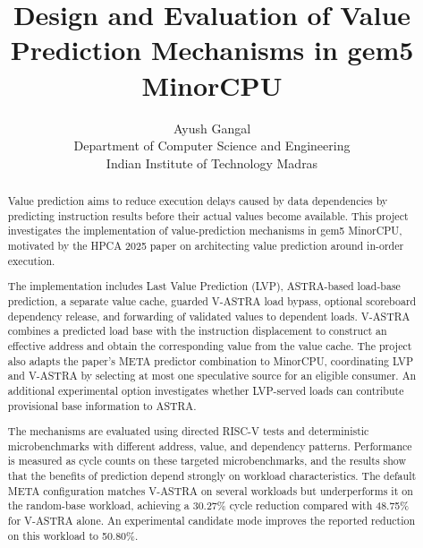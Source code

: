 \documentclass[11pt,a4paper]{article}
\title{
    \textbf{Design and Evaluation of Value Prediction
    Mechanisms in gem5 MinorCPU}
}
\author{
    Ayush Gangal\\
    Department of Computer Science and Engineering\\
    Indian Institute of Technology Madras
}
\date{}
\begin{document}
\maketitle

\begin{abstract}
Value prediction aims to reduce execution delays caused by data
dependencies by predicting instruction results before their actual
values become available. This project investigates the implementation
of value-prediction mechanisms in gem5 MinorCPU, motivated by the
HPCA 2025 paper on architecting value prediction around in-order
execution.

The implementation includes Last Value Prediction (LVP), ASTRA-based
load-base prediction, a separate value cache, guarded V-ASTRA load
bypass, optional scoreboard dependency release, and forwarding of
validated values to dependent loads. V-ASTRA combines a predicted
load base with the instruction displacement to construct an effective
address and obtain the corresponding value from the value cache.
The project also adapts the paper's META predictor combination to
MinorCPU, coordinating LVP and V-ASTRA by selecting at most one
speculative source for an eligible consumer.
An additional experimental option investigates whether LVP-served
loads can contribute provisional base information to ASTRA.

The mechanisms are evaluated using directed RISC-V tests and
deterministic microbenchmarks with different address, value, and
dependency patterns. Performance is measured as cycle counts on these targeted microbenchmarks, and the results show
that the benefits of prediction depend strongly on workload
characteristics. The default META configuration matches V-ASTRA on
several workloads but underperforms it on the random-base workload,
achieving a 30.27\% cycle reduction compared with 48.75\% for
V-ASTRA alone.
An experimental candidate mode improves the reported reduction
on this workload to 50.80\%.
\end{abstract}

\newpage

\tableofcontents
\newpage











\end{document}
